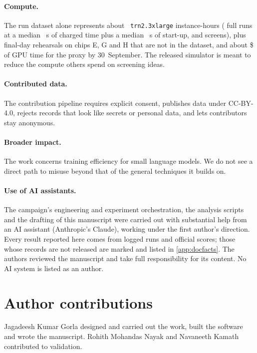 \paragraph{Compute.} The run dataset alone represents about ~\texttt{trn2.3xlarge} instance-hours
( full runs at a median ~s of charged time plus a median
~s of start-up, and  screens), plus final-day rehearsals on chips E, G and H
that are not in the dataset, and about \$\docnum{} of GPU time for the proxy by 30~September.
The released simulator is meant to reduce the compute others spend on screening ideas.

\paragraph{Contributed data.} The contribution pipeline requires explicit consent, publishes data under CC-BY-4.0,
rejects records that look like secrets or personal data, and lets contributors stay anonymous.

\paragraph{Broader impact.} The work concerns training efficiency for small language models. We do not see a direct
path to misuse beyond that of the general techniques it builds on.

\paragraph{Use of AI assistants.} The campaign's engineering and experiment orchestration, the analysis scripts and
the drafting of this manuscript were carried out with substantial help from an AI assistant (Anthropic's Claude),
working under the first author's direction. Every result reported here comes from logged runs and official scores;
those whose records are not released are marked \docnum{} and listed in \cref{app:docfacts}. The authors reviewed the
manuscript and take full responsibility for its content. No AI system is listed as an author.

\ifanonymous\else
\section*{Author contributions}

Jagadeesh Kumar Gorla designed and carried out the work, built the software and wrote the manuscript. Rohith Mohandas
Nayak and Navaneeth Kamath contributed to validation.

